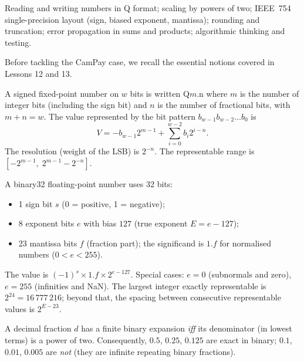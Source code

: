 \documentclass[11pt]{article}
\newcommand{\cle}[1]{{\popxbold\color{popdark}#1}}
\newcounter{popsec}
\newcounter{popsub}
\newcommand{\courssub}[1]{%
  \stepcounter{popsub}%
  \par\vspace{9pt}\noindent{\popxbold\fontsize{11.5}{13}\selectfont\color{popink}{\color{poporange}\thepopsec.\thepopsub}\hspace{6pt}#1}\par\nopagebreak\vspace{4pt}
}
\begin{document}
\begin{aretenir}
Reading and writing numbers in Q format; scaling by powers of two; IEEE~754 single-precision layout (sign, biased exponent, mantissa); rounding and truncation; error propagation in sums and products; algorithmic thinking and testing.
\end{aretenir}

\courssub{Theoretical Background}

Before tackling the CamPay case, we recall the essential notions covered in Lessons 12 and 13.

\begin{definition}
A signed fixed-point number on $w$ bits is written \cle{Q$m$.n} where $m$ is the number of integer bits (including the sign bit) and $n$ is the number of fractional bits, with $m+n = w$. The value represented by the bit pattern $b_{w-1}b_{w-2}\dots b_0$ is
\[
V = -b_{w-1}2^{m-1} + \sum_{i=0}^{w-2} b_i 2^{i-n}.
\]
The \cle{resolution} (weight of the LSB) is $2^{-n}$. The representable range is $[-2^{m-1},\; 2^{m-1}-2^{-n}]$.
\end{definition}

\begin{definition}
A \cle{binary32} floating-point number uses 32 bits:
\begin{itemize}
\item 1 sign bit $s$ (0 = positive, 1 = negative);
\item 8 exponent bits $e$ with bias $127$ (true exponent $E = e-127$);
\item 23 mantissa bits $f$ (fraction part); the significand is $1.f$ for normalised numbers ($0<e<255$).
\end{itemize}
The value is $(-1)^s \times 1.f \times 2^{e-127}$. Special cases: $e=0$ (subnormals and zero), $e=255$ (infinities and NaN).
The largest integer exactly representable is $2^{24}=16\,777\,216$; beyond that, the spacing between consecutive representable values is $2^{E-23}$.
\end{definition}

\begin{propriete}
A decimal fraction $d$ has a finite binary expansion \emph{iff} its denominator (in lowest terms) is a power of two. Consequently, $0.5$, $0.25$, $0.125$ are exact in binary; $0.1$, $0.01$, $0.005$ are \emph{not} (they are infinite repeating binary fractions).
\end{propriete}
\end{document}
